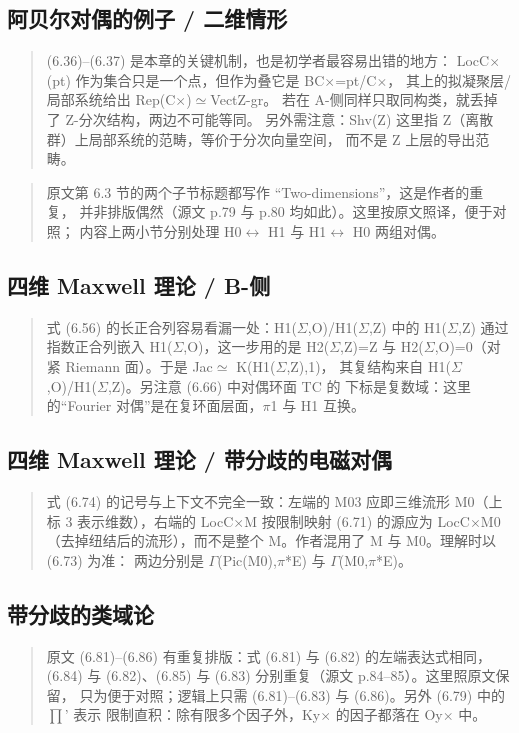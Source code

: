 \subsection*{阿贝尔对偶的例子 / 二维情形}
\begin{quote}\small
(6.36)--(6.37) 是本章的关键机制，也是初学者最容易出错的地方： LocC$\times$(pt) 作为集合只是一个点，但作为叠它是 BC$\times$=pt/C$\times$， 其上的拟凝聚层/局部系统给出 Rep(C$\times$)$\simeq$VectZ-gr。 若在 A-侧同样只取同构类，就丢掉了 Z-分次结构，两边不可能等同。 另外需注意：Shv(Z) 这里指 Z（离散群）上局部系统的范畴，等价于分次向量空间， 而不是 Z 上层的导出范畴。
\end{quote}

\begin{quote}\small
原文第 6.3 节的两个子节标题都写作 “Two-dimensions”，这是作者的重复， 并非排版偶然（源文 p.79 与 p.80 均如此）。这里按原文照译，便于对照； 内容上两小节分别处理 H0$\leftrightarrow$ H1 与 H1$\leftrightarrow$ H0 两组对偶。
\end{quote}

\subsection*{四维 Maxwell 理论 / B-侧}
\begin{quote}\small
式 (6.56) 的长正合列容易看漏一处：H1($\Sigma$,O)/H1($\Sigma$,Z) 中的 H1($\Sigma$,Z) 通过指数正合列嵌入 H1($\Sigma$,O)，这一步用的是 H2($\Sigma$,Z)=Z 与 H2($\Sigma$,O)=0（对紧 Riemann 面）。于是 Jac$\simeq$ K(H1($\Sigma$,Z),1)， 其复结构来自 H1($\Sigma$,O)/H1($\Sigma$,Z)。另注意 (6.66) 中对偶环面 TC 的 下标是复数域：这里的“Fourier 对偶”是在复环面层面，$\pi$1 与 H1 互换。
\end{quote}

\subsection*{四维 Maxwell 理论 / 带分歧的电磁对偶}
\begin{quote}\small
式 (6.74) 的记号与上下文不完全一致：左端的 M03 应即三维流形 M0（上标 3 表示维数），右端的 LocC$\times$M 按限制映射 (6.71) 的源应为 LocC$\times$M0 （去掉纽结后的流形），而不是整个 M。作者混用了 M 与 M0。理解时以 (6.73) 为准： 两边分别是 $\Gamma$(Pic(M0),$\pi$*E) 与 $\Gamma$(M0,$\pi$*E)。
\end{quote}

\subsection*{带分歧的类域论}
\begin{quote}\small
原文 (6.81)--(6.86) 有重复排版：式 (6.81) 与 (6.82) 的左端表达式相同， (6.84) 与 (6.82)、(6.85) 与 (6.83) 分别重复（源文 p.84--85）。这里照原文保留， 只为便于对照；逻辑上只需 (6.81)--(6.83) 与 (6.86)。另外 (6.79) 中的 $\prod$' 表示 限制直积：除有限多个因子外，Ky$\times$ 的因子都落在 Oy$\times$ 中。
\end{quote}


